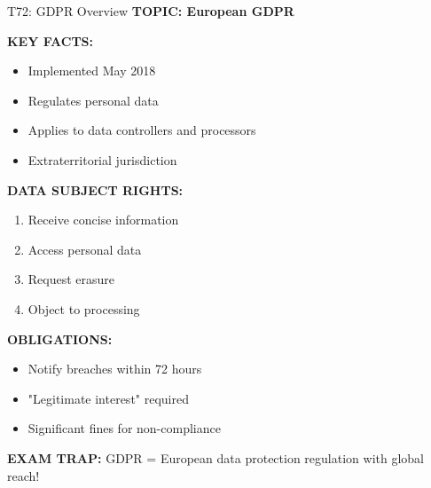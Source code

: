 \documentclass[8pt]{beamer}
\begin{document}
	\begin{frame}{T72: GDPR Overview}
		\fontsize{6.5}{7.5}\selectfont
		\textbf{TOPIC: European GDPR}
		
		\vspace{0.1cm}
		\textbf{KEY FACTS:}
		\begin{itemize}
			\item Implemented May 2018
			\item Regulates personal data
			\item Applies to data controllers and processors
			\item Extraterritorial jurisdiction
		\end{itemize}
		
		\vspace{0.1cm}
		\textbf{DATA SUBJECT RIGHTS:}
		\begin{enumerate}
			\item Receive concise information
			\item Access personal data
			\item Request erasure
			\item Object to processing
		\end{enumerate}
		
		\vspace{0.1cm}
		\textbf{OBLIGATIONS:}
		\begin{itemize}
			\item Notify breaches within 72 hours
			\item "Legitimate interest" required
			\item Significant fines for non-compliance
		\end{itemize}
		
		\textcolor{myred}{\textbf{EXAM TRAP:}} GDPR = \textcolor{myblue}{European data protection regulation} with global reach!
	\end{frame}
	
\end{document}
